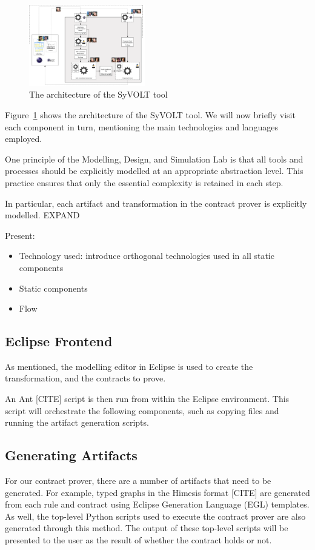 \begin{figure}
\centering
\includegraphics[width=0.45\textwidth]{figures/syvolt_arch}
\caption{The architecture of the SyVOLT tool}
\label{fig:arch}
\end{figure}

Figure~\ref{fig:arch} shows the architecture of the SyVOLT tool. We will now briefly visit each component in turn, mentioning the main technologies and languages employed.


One principle of the Modelling, Design, and Simulation Lab is that all tools and processes should be explicitly modelled at an appropriate abstraction level. This practice ensures that only the essential complexity is retained in each step.

In particular, each artifact and transformation in the contract prover is explicitly modelled. EXPAND

Present:
\begin{itemize}
  \item Technology used: introduce orthogonal technologies used in all
  static components
  \item Static components
  \item Flow
\end{itemize}


\subsection{Eclipse Frontend}

As mentioned, the modelling editor in Eclipse is used to create the transformation, and the contracts to prove.

An Ant [CITE] script is then run from within the Eclipse environment. This script will orchestrate the following components, such as copying files and running the artifact generation scripts.


\subsection{Generating Artifacts}
For our contract prover, there are a number of artifacts that need to be generated. For example, typed graphs in the Himesis format [CITE] are generated from each rule and contract using Eclipse Generation Language (EGL) templates. As well, the top-level Python scripts used to execute the contract prover are also generated through this method. The output of these top-level scripts will be presented to the user as the result of whether the contract holds or not.

